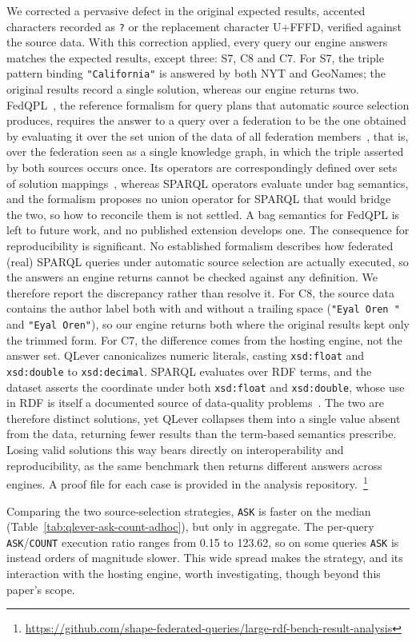 We corrected a pervasive defect in the original expected results, accented characters recorded as \texttt{?} or the replacement character U+FFFD, verified against the source data.
With this correction applied, every query our engine answers matches the expected results, except three: S7, C8 and C7.
For S7, the triple pattern binding \texttt{"California"} is answered by both NYT and GeoNames; the original results record a single solution, whereas our engine returns two.
FedQPL~\cite{Cheng2021}, the reference formalism for query plans that automatic source selection produces, requires the answer to a query over a federation to be the one obtained by evaluating it over the set union of the data of all federation members~\cite[Def.~3]{Cheng2021}, that is, over the federation seen as a single knowledge graph, in which the triple asserted by both sources occurs once.
Its operators are correspondingly defined over sets of solution mappings~\cite[Def.~6]{Cheng2021}, whereas SPARQL operators evaluate under bag semantics, and the formalism proposes no union operator for SPARQL that would bridge the two, so how to reconcile them is not settled.
A bag semantics for FedQPL is left to future work, and no published extension develops one.
The consequence for reproducibility is significant.
No established formalism describes how federated (real) SPARQL queries under automatic source selection are actually executed, so the answers an engine returns cannot be checked against any definition.
We therefore report the discrepancy rather than resolve it.
For C8, the source data contains the author label both with and without a trailing space (\texttt{"Eyal Oren "} and \texttt{"Eyal Oren"}), so our engine returns both where the original results kept only the trimmed form.
For C7, the difference comes from the hosting engine, not the answer set.
QLever canonicalizes numeric literals, casting \texttt{xsd:float} and \texttt{xsd:double} to \texttt{xsd:decimal}.
SPARQL evaluates over RDF terms, and the dataset asserts the coordinate under both \texttt{xsd:float} and \texttt{xsd:double}, whose use in RDF is itself a documented source of data-quality problems~\cite{keil2022floating}.
The two are therefore distinct solutions, yet QLever collapses them into a single value absent from the data, returning fewer results than the term-based semantics prescribe.
Losing valid solutions this way bears directly on interoperability and reproducibility, as the same benchmark then returns different answers across engines.
A proof file for each case is provided in the analysis repository.~\footnote{\url{https://github.com/shape-federated-queries/large-rdf-bench-result-analysis}}

Comparing the two source-selection strategies, \texttt{ASK} is faster on the median (Table~\ref{tab:qlever-ask-count-adhoc}), but only in aggregate.
The per-query \texttt{ASK}/\texttt{COUNT} execution ratio ranges from 0.15 to 123.62, so on some queries \texttt{ASK} is instead orders of magnitude slower.
This wide spread makes the strategy, and its interaction with the hosting engine, worth investigating, though beyond this paper's scope.


